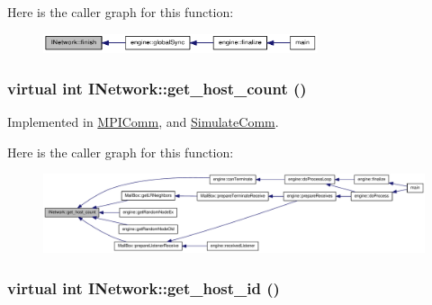 Here is the caller graph for this function:\nopagebreak
\begin{figure}[H]
\begin{center}
\leavevmode
\includegraphics[width=229pt]{class_i_network_a667e56ba7f3713c949f84573ae710a85_icgraph}
\end{center}
\end{figure}
\hypertarget{class_i_network_a24bd475422706998cbee500825728d55}{
\subsubsection[{get\_\-host\_\-count}]{\setlength{\rightskip}{0pt plus 5cm}virtual int INetwork::get\_\-host\_\-count ()}}
\label{class_i_network_a24bd475422706998cbee500825728d55}


Implemented in \hyperlink{class_m_p_i_comm_a991f93012b8d83f7ca54fc780555c683}{MPIComm}, and \hyperlink{class_simulate_comm_abce134f416c691a6910fcf6601ee8829}{SimulateComm}.

Here is the caller graph for this function:\nopagebreak
\begin{figure}[H]
\begin{center}
\leavevmode
\includegraphics[width=420pt]{class_i_network_a24bd475422706998cbee500825728d55_icgraph}
\end{center}
\end{figure}
\hypertarget{class_i_network_aef01bb260a8e60c7c9085b381cf86f13}{
\subsubsection[{get\_\-host\_\-id}]{\setlength{\rightskip}{0pt plus 5cm}virtual int INetwork::get\_\-host\_\-id ()}}
\label{class_i_network_aef01bb260a8e60c7c9085b381cf86f13}


